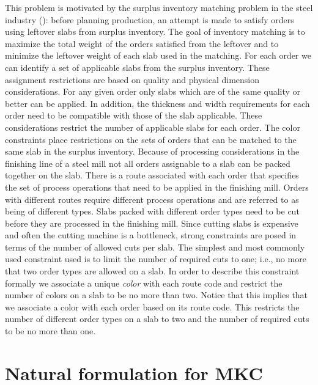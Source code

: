 This problem is motivated by the surplus inventory matching problem in the
steel industry (\cite{KDTL}): before planning production, an attempt is made
to satisfy orders using leftover slabs from surplus inventory. The goal of
inventory matching is to maximize the total weight of the orders satisfied
from the leftover and to minimize the leftover weight of each slab used in the
matching. For each order we can identify a set of applicable slabs from the
surplus inventory.  These assignment restrictions are based on quality and
physical dimension considerations.  For any given order only slabs which are
of the same quality or better can be applied.  In addition, the thickness and
width requirements for each order need to be compatible with those of the slab
applicable.  These considerations restrict the number of applicable slabs for
each order. The color constraints place restrictions on the sets of orders
that can be matched to the same slab in the surplus inventory. Because of
processing considerations in the finishing line of a steel mill not all orders
assignable to a slab can be packed together on the slab. There is a route
associated with each order that specifies the set of process operations that
need to be applied in the finishing mill. Orders with different routes require
different process operations and are referred to as being of different types.
Slabs packed with different order types need to be cut before they are
processed in the finishing mill.  Since cutting slabs is expensive and often
the cutting machine is a bottleneck, strong constraints are posed in terms of
the number of allowed cuts per slab. The simplest and most commonly used
constraint used is to limit the number of required cuts to one; i.e., no more
that two order types are allowed on a slab.  In order to describe this
constraint formally we associate a unique {\em color} with each route code and
restrict the number of colors on a slab to be no more than two.  Notice that
this implies that we associate a color with each order based on its route
code.  This restricts the number of different order types on a slab to two and
the number of required cuts to be no more than one.


\section{Natural formulation for MKC}


